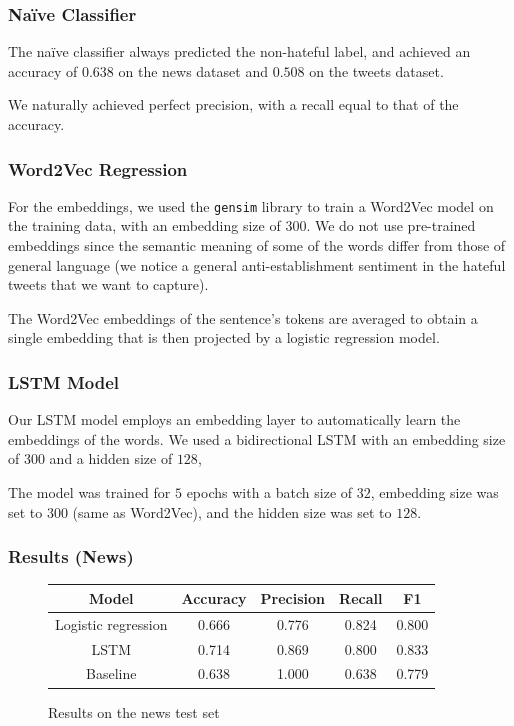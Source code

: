\documentclass[english, xcolor={table,usenames}]{beamer}
\begin{document}
\begin{frame}
  \frametitle{Naïve Classifier}

  The naïve classifier always predicted the \alert{non-hateful} label, and achieved
  an accuracy of $0.638$ on the news dataset and $0.508$ on the tweets dataset.

  We naturally achieved \alert{perfect} precision, with a recall equal to that
  of the accuracy.
\end{frame}

\begin{frame}
  \frametitle{Word2Vec Regression}

  For the embeddings, we used the \texttt{gensim} library to train a Word2Vec model
  on the training data, with an embedding size of $300$. We do \alert{not} use pre-trained embeddings since the semantic meaning of
  some of the words differ from those of general language (we notice a general anti-establishment
  sentiment in the hateful tweets that we want to capture).

  The Word2Vec embeddings of the sentence's tokens are averaged to obtain a single embedding
  that is then projected by a logistic regression model.
\end{frame}

\begin{frame}
  \frametitle{LSTM Model}

  Our LSTM model employs an embedding layer to automatically learn the embeddings of the words. We used a bidirectional LSTM with an embedding size of $300$ and a hidden size of $128$,

  The model was trained for $5$ epochs with a batch size of $32$, embedding size was set to $300$ (same as Word2Vec), and the hidden size was set to $128$.

\end{frame}

\begin{frame}[fragile]
  \frametitle{Results (News)}

  \begin{figure}[h]
    \centering
    \caption{Results on the news test set}
    \begin{tabular}{|c|c|c|c|c|}
      \hline
      Model               & Accuracy & Precision & Recall & F1    \\
      \hline
      \hline
      Logistic regression & 0.666    & 0.776     & 0.824  & 0.800 \\
      LSTM                & 0.714    & 0.869     & 0.800  & 0.833 \\
      Baseline            & 0.638    & 1.000     & 0.638  & 0.779 \\
      \hline
    \end{tabular}
  \end{figure}

\end{frame}
\end{document}
